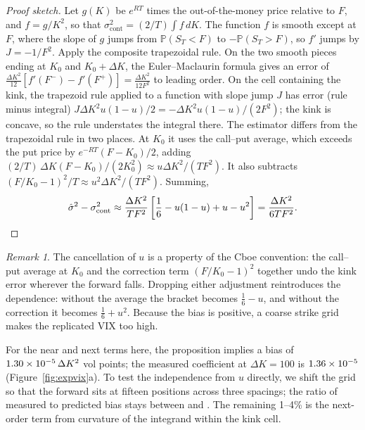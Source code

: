 \documentclass[11pt]{article}
\theoremstyle{remark}
\newtheorem*{remark}{Remark}
\newcommand{\dK}{\Delta K}
\begin{document}
\begin{proof}[Proof sketch]
Let $g(K)$ be $e^{RT}$ times the out-of-the-money price relative to $F$, and $f = g/K^2$, so that $\sigma^2_{\text{cont}} = (2/T)\int f\,dK$.
The function $f$ is smooth except at $F$, where the slope of $g$ jumps from $\mathbb{P}(S_T < F)$ to $-\mathbb{P}(S_T > F)$, so $f'$ jumps by $J = -1/F^2$.
Apply the composite trapezoidal rule.
On the two smooth pieces ending at $K_0$ and $K_0 + \dK$, the Euler--Maclaurin formula gives an error of $\tfrac{\dK^2}{12}\left[f'(F^-) - f'(F^+)\right] = \tfrac{\dK^2}{12F^2}$ to leading order.
On the cell containing the kink, the trapezoid rule applied to a function with slope jump $J$ has error (rule minus integral) $J\dK^2 u(1-u)/2 = -\dK^2 u(1-u)/(2F^2)$; the kink is concave, so the rule understates the integral there.
The estimator differs from the trapezoidal rule in two places.
At $K_0$ it uses the call--put average, which exceeds the put price by $e^{-RT}(F - K_0)/2$, adding $(2/T)\,\dK (F - K_0)/(2K_0^2) \approx u\dK^2/(TF^2)$.
It also subtracts $(F/K_0 - 1)^2/T \approx u^2 \dK^2/(TF^2)$.
Summing,
\begin{equation*}
  \hat\sigma^2 - \sigma^2_{\text{cont}} \approx \frac{\dK^2}{TF^2}\left[\frac16 - u(1-u) + u - u^2\right] = \frac{\dK^2}{6TF^2}. \qedhere
\end{equation*}
\end{proof}

\begin{remark}
The cancellation of $u$ is a property of the Cboe convention: the call--put average at $K_0$ and the correction term $(F/K_0-1)^2$ together undo the kink error wherever the forward falls.
Dropping either adjustment reintroduces the dependence: without the average the bracket becomes $\tfrac16 - u$, and without the correction it becomes $\tfrac16 + u^2$.
Because the bias is positive, a coarse strike grid makes the replicated VIX too high.
\end{remark}

For the near and next terms here, the proposition implies a bias of $\AThetaCoef \times 10^{-5}\,\dK^2$ vol points; the measured coefficient at $\dK = 100$ is $1.36 \times 10^{-5}$ (Figure~\ref{fig:expvix}a).
To test the independence from $u$ directly, we shift the grid so that the forward sits at fifteen positions across three spacings; the ratio of measured to predicted bias stays between \FPCMin{} and \FPCMax.
The remaining 1--4\% is the next-order term from curvature of the integrand within the kink cell.
\end{document}
